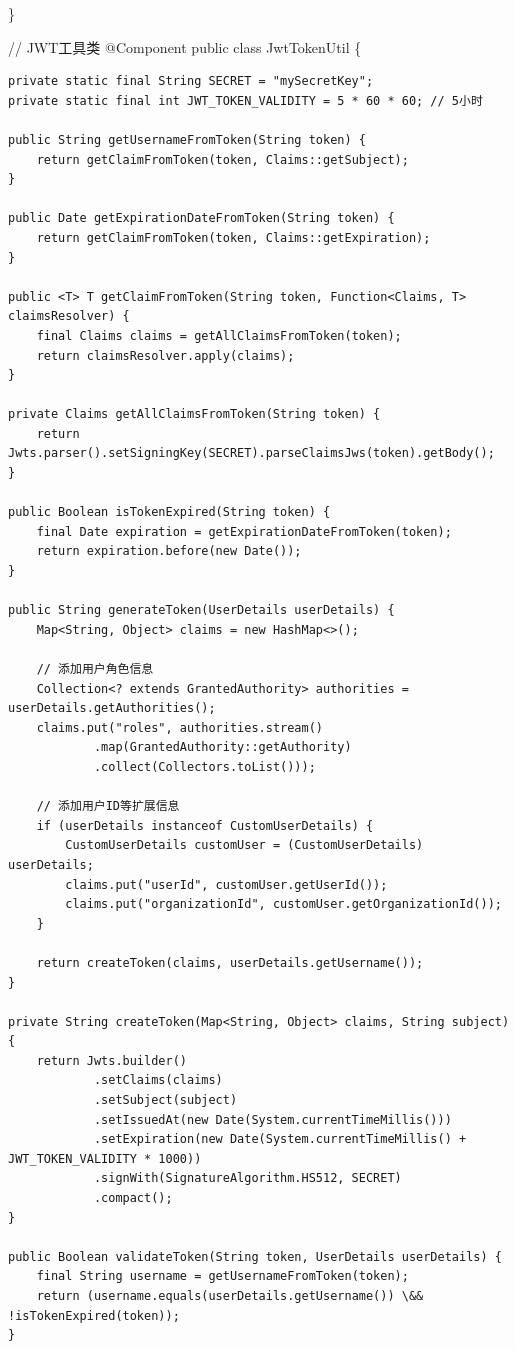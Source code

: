 \}

// JWT工具类 @Component public class JwtTokenUtil \{

\begin{verbatim}
private static final String SECRET = "mySecretKey";
private static final int JWT_TOKEN_VALIDITY = 5 * 60 * 60; // 5小时

public String getUsernameFromToken(String token) {
    return getClaimFromToken(token, Claims::getSubject);
}

public Date getExpirationDateFromToken(String token) {
    return getClaimFromToken(token, Claims::getExpiration);
}

public <T> T getClaimFromToken(String token, Function<Claims, T> claimsResolver) {
    final Claims claims = getAllClaimsFromToken(token);
    return claimsResolver.apply(claims);
}

private Claims getAllClaimsFromToken(String token) {
    return Jwts.parser().setSigningKey(SECRET).parseClaimsJws(token).getBody();
}

public Boolean isTokenExpired(String token) {
    final Date expiration = getExpirationDateFromToken(token);
    return expiration.before(new Date());
}

public String generateToken(UserDetails userDetails) {
    Map<String, Object> claims = new HashMap<>();
    
    // 添加用户角色信息
    Collection<? extends GrantedAuthority> authorities = userDetails.getAuthorities();
    claims.put("roles", authorities.stream()
            .map(GrantedAuthority::getAuthority)
            .collect(Collectors.toList()));
            
    // 添加用户ID等扩展信息
    if (userDetails instanceof CustomUserDetails) {
        CustomUserDetails customUser = (CustomUserDetails) userDetails;
        claims.put("userId", customUser.getUserId());
        claims.put("organizationId", customUser.getOrganizationId());
    }
    
    return createToken(claims, userDetails.getUsername());
}

private String createToken(Map<String, Object> claims, String subject) {
    return Jwts.builder()
            .setClaims(claims)
            .setSubject(subject)
            .setIssuedAt(new Date(System.currentTimeMillis()))
            .setExpiration(new Date(System.currentTimeMillis() + JWT_TOKEN_VALIDITY * 1000))
            .signWith(SignatureAlgorithm.HS512, SECRET)
            .compact();
}

public Boolean validateToken(String token, UserDetails userDetails) {
    final String username = getUsernameFromToken(token);
    return (username.equals(userDetails.getUsername()) \&& !isTokenExpired(token));
}
\end{verbatim}

